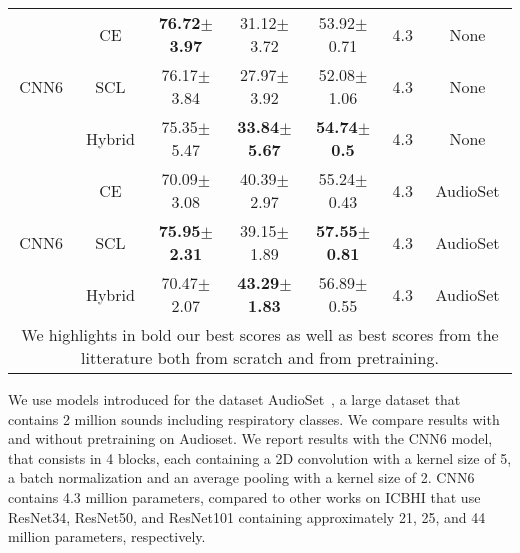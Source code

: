 \documentclass{article}
\begin{document}
\begin{sloppy}
\begin{table*}[h]
\begin{center}
{\begin{tabular}{|cc|ccccc|}
                                                                                                           \\ \hline \multicolumn{1}{|c|}{\multirow{3}{*}{CNN6}}               & CE                & \multicolumn{1}{c|}{\textbf{76.72$\pm$3.97}} & \multicolumn{1}{c|}{31.12$\pm$3.72} & \multicolumn{1}{c|}{53.92$\pm$0.71} & \multicolumn{1}{c|}{4.3}                     & None            \\ \multicolumn{1}{|c|}{}                                    & SCL               & \multicolumn{1}{c|}{76.17$\pm$3.84} & \multicolumn{1}{c|}{27.97$\pm$3.92} & \multicolumn{1}{c|}{52.08$\pm$1.06} & \multicolumn{1}{c|}{4.3}                     & None            \\ \multicolumn{1}{|c|}{}                                    & Hybrid            & \multicolumn{1}{c|}{75.35$\pm$5.47} & \multicolumn{1}{c|}{\textbf{33.84$\pm$5.67}} & \multicolumn{1}{c|}{\textbf{54.74$\pm$0.5}}  & \multicolumn{1}{c|}{4.3}                     & None            \\ \hline \multicolumn{1}{|c|}{\multirow{3}{*}{CNN6}}               & CE                & \multicolumn{1}{c|}{70.09$\pm$3.08} & \multicolumn{1}{c|}{40.39$\pm$2.97} & \multicolumn{1}{c|}{55.24$\pm$0.43} & \multicolumn{1}{c|}{4.3}                     & AudioSet     \\ \multicolumn{1}{|c|}{}                                    & SCL               & \multicolumn{1}{c|}{\textbf{75.95$\pm$2.31}} & \multicolumn{1}{c|}{39.15$\pm$1.89} & \multicolumn{1}{c|}{\textbf{57.55$\pm$0.81}} & \multicolumn{1}{c|}{4.3}                     & AudioSet     \\ \multicolumn{1}{|c|}{}                                    & Hybrid            & \multicolumn{1}{c|}{70.47$\pm$2.07} & \multicolumn{1}{c|}{\textbf{43.29$\pm$1.83}} & \multicolumn{1}{c|}{56.89$\pm$0.55} & \multicolumn{1}{c|}{4.3}                     & AudioSet     \\
 \hline
 \multicolumn{7}{c}{\scriptsize *We highlights in bold our best scores as well as best scores from the litterature both from scratch and from pretraining.} \\
\end{tabular}
}
\end{center}
\end{table*}


We use models introduced for the dataset AudioSet~\cite{Kong2020PANNsLP}, a large dataset that contains 2 million sounds including respiratory classes. We compare results with and without pretraining on Audioset. 
We report results with the CNN6 model, that consists in 4 blocks, each containing a 2D convolution with a kernel size of 5, a batch normalization and an average pooling with a kernel size of 2. CNN6  contains 4.3 million parameters, compared to other works on ICBHI that use ResNet34, ResNet50, and ResNet101 containing approximately 21, 25, and 44 million parameters, respectively\cite{gairola2020respirenet,9729496}.


\end{sloppy}
\end{document}
